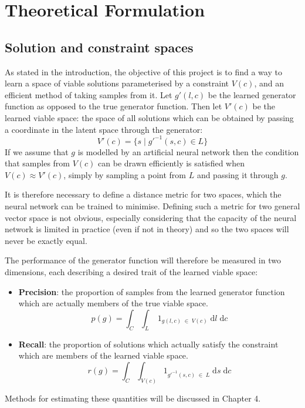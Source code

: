 \documentclass[../../main.tex]{subfiles}
\begin{document}
\chapter{Theoretical Formulation} \label{chapter:theoreticalFormulation}

\section{Solution and constraint spaces} \label{section:solutionAndConstraintSpaces}

As stated in the introduction, the objective of this project is to find a way to learn a space of viable solutions parameterised by a constraint $V(c)$, and an efficient method of taking samples from it.
Let $g'(l,c)$ be the learned generator function as opposed to the true generator function.
Then let $V'(c)$ be the learned viable space: the space of all solutions which can be obtained by passing a coordinate in the latent space through the generator:
$$V'(c)=\{s\;|\;g'^{-1}(s,c)\in L\}$$
If we assume that $g$ is modelled by an artificial neural network then the condition that samples from $V(c)$ can be drawn efficiently is satisfied when $V(c)\approx V'(c)$, simply by sampling a point from $L$ and passing it through $g$.

It is therefore necessary to define a distance metric for two spaces, which the neural network can be trained to minimise.
Defining such a metric for two general vector space is not obvious, especially considering that the capacity of the neural network is limited in practice (even if not in theory) and so the two spaces will never be exactly equal.

The performance of the generator function will therefore be measured in two dimensions, each describing a desired trait of the learned viable space:
\begin{itemize}
    \item[] \textbf{Precision}: the proportion of samples from the learned generator function which are actually members of the true viable space.
    $$p(g)=\int_{C}\int_{L}\;1_{g(l, c)\;\in\;V(c)}\;\mathrm{d}l\;\mathrm{d}c$$ 
    \item[] \textbf{Recall}: the proportion of solutions which actually satisfy the constraint which are members of the learned viable space.
    $$r(g)=\int_{C}\int_{V(c)}1_{g'^{-1}(s,c)\;\in\;L}\;\mathrm{d}s\;\mathrm{d}c$$ 
\end{itemize}
Methods for estimating these quantities will be discussed in Chapter 4.
\end{document}
